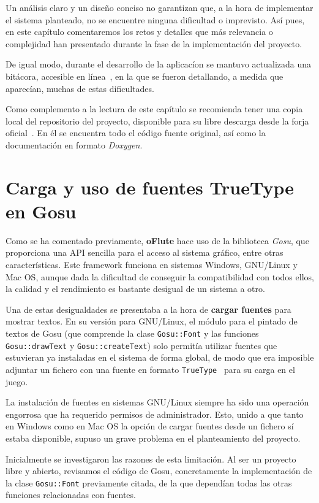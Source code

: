 Un análisis claro y un diseño conciso no garantizan que, a la hora de
implementar el sistema planteado, no se encuentre ninguna dificultad o
imprevisto. Así pues, en este capítulo comentaremos los retos y detalles que más
relevancia o complejidad han presentado durante la fase de la implementación del
proyecto.

De igual modo, durante el desarrollo de la aplicacíon se mantuvo actualizada una
bitácora, accesible en línea~\cite{ofluteblog}, en la que se fueron detallando,
a medida que aparecían, muchas de estas dificultades.

Como complemento a la lectura de este capítulo se recomienda tener una copia
local del repositorio del proyecto, disponible para su libre descarga desde la
forja oficial~\cite{ofluteforja}. En él se encuentra todo el código fuente
original, así como la documentación en formato \textit{Doxygen}.

\section{Carga y uso de fuentes TrueType en Gosu}

Como se ha comentado previamente, \textbf{oFlute} hace uso de la biblioteca
\textit{Gosu}, que proporciona una API sencilla para el acceso al sistema
gráfico, entre otras características. Este framework funciona en sistemas
Windows, GNU/Linux y Mac OS, aunque dada la dificultad de conseguir la
compatibilidad con todos ellos, la calidad y el rendimiento es bastante
desigual de un sistema a otro.

Una de estas desigualdades se presentaba a la hora de \textbf{cargar fuentes}
para mostrar textos. En su versión para GNU/Linux, el módulo para el pintado de
textos de Gosu (que comprende la clase \texttt{Gosu::Font} y las funciones
\texttt{Gosu::drawText} y \texttt{Gosu::createText}) solo permitía
utilizar fuentes que estuvieran ya instaladas en el sistema de forma global, de
modo que era imposible adjuntar un fichero con una fuente en formato
\texttt{TrueType}~\cite{reftruetype} para su carga en el juego. 

La instalación de fuentes en sistemas GNU/Linux siempre ha sido una operación
engorrosa que ha requerido permisos de administrador. Esto, unido a que tanto en
Windows como en Mac OS la opción de cargar fuentes desde un fichero sí estaba
disponible, supuso un grave problema en el planteamiento del proyecto.

Inicialmente se investigaron las razones de esta limitación. Al ser un proyecto
libre y abierto, revisamos el código de Gosu, concretamente la implementación
de la clase \texttt{Gosu::Font} previamente citada, de la que dependían todas
las otras funciones relacionadas con fuentes.

